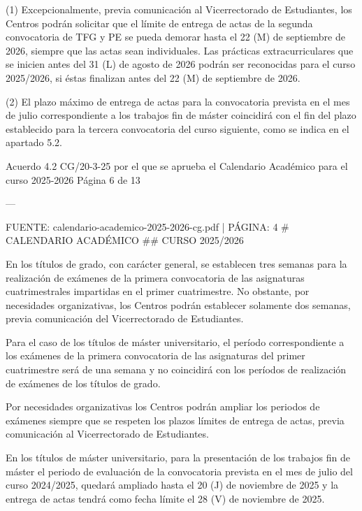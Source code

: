 \documentclass{article}
\begin{document}
\begin{itemize}
\begin{itemize}
\begin{scriptsize}
                  (1) Excepcionalmente, previa comunicación al Vicerrectorado de Estudiantes, los Centros podrán solicitar que el límite de entrega de actas de la segunda convocatoria de TFG y PE se pueda demorar hasta el 22 (M) de septiembre de 2026, siempre que las actas sean individuales. Las prácticas extracurriculares que se inicien antes del 31 (L) de agosto de 2026 podrán ser reconocidas para el curso 2025/2026, si éstas finalizan antes del 22 (M) de septiembre de 2026.

                  (2) El plazo máximo de entrega de actas para la convocatoria prevista en el mes de julio correspondiente a los trabajos fin de máster coincidirá con el fin del plazo establecido para la tercera convocatoria del curso siguiente, como se indica en el apartado 5.2.

                  Acuerdo 4.2 CG/20-3-25 por el que se aprueba el Calendario Académico para el curso 2025-2026  Página 6 de 13

                  ---

                  FUENTE: calendario-academico-2025-2026-cg.pdf | PÁGINA: 4
                  \# CALENDARIO ACADÉMICO
                  \#\# CURSO 2025/2026

                  En los títulos de grado, con carácter general, se establecen tres semanas para la realización de exámenes de la primera convocatoria de las asignaturas cuatrimestrales impartidas en el primer cuatrimestre. No obstante, por necesidades organizativas, los Centros podrán establecer solamente dos semanas, previa comunicación del Vicerrectorado de Estudiantes.

                  Para el caso de los títulos de máster universitario, el período correspondiente a los exámenes de la primera convocatoria de las asignaturas del primer cuatrimestre será de una semana y no coincidirá con los períodos de realización de exámenes de los títulos de grado.

                  Por necesidades organizativas los Centros podrán ampliar los periodos de exámenes siempre que se respeten los plazos límites de entrega de actas, previa comunicación al Vicerrectorado de Estudiantes.

                  En los títulos de máster universitario, para la presentación de los trabajos fin de máster el periodo de evaluación de la convocatoria prevista en el mes de julio del curso 2024/2025, quedará ampliado hasta el 20 (J) de noviembre de 2025 y la entrega de actas tendrá como fecha límite el 28 (V) de noviembre de 2025.


\end{scriptsize}
\end{itemize}
\end{itemize}
\end{document}
